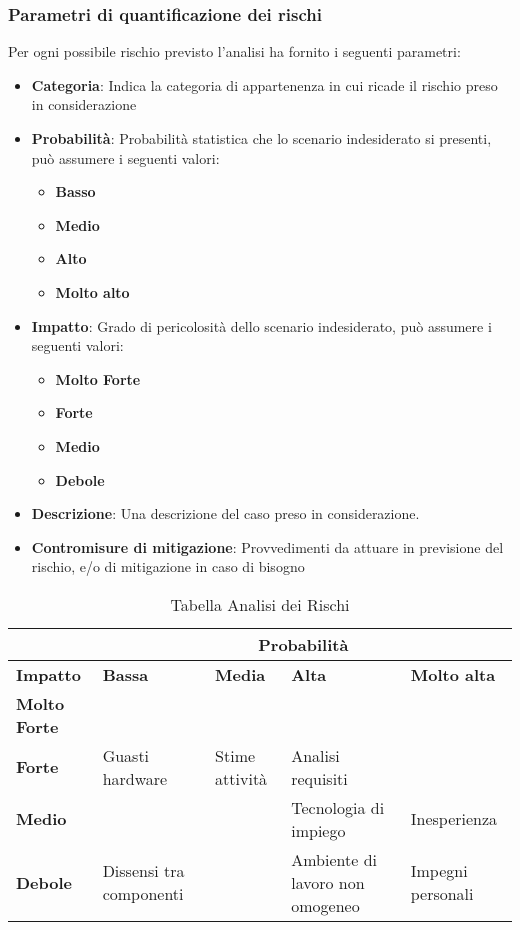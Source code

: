 \documentclass{scalatekids-article}
\begin{document}
\subsubsection{Parametri di quantificazione dei rischi}
Per ogni possibile rischio previsto l'analisi ha fornito i seguenti parametri:
\begin{itemize}
\item\textbf{Categoria}: Indica la categoria di appartenenza in cui ricade il
  rischio preso in considerazione
\item\textbf{Probabilità}: Probabilità statistica che lo scenario indesiderato
  si presenti, può assumere i seguenti valori:
  \begin{itemize}
  \item\textbf{Basso}
  \item\textbf{Medio}
  \item\textbf{Alto}
  \item\textbf{Molto alto}
  \end{itemize}
\item\textbf{Impatto}: Grado di pericolosità dello scenario indesiderato, può
  assumere i seguenti valori:
  \begin{itemize}
  \item\textbf{Molto Forte}
  \item\textbf{Forte}
  \item\textbf{Medio}
  \item\textbf{Debole}
  \end{itemize}
\item\textbf{Descrizione}: Una descrizione del caso preso in considerazione.
\item\textbf{Contromisure di mitigazione}: Provvedimenti da attuare in
  previsione del rischio, e/o di mitigazione in caso di bisogno
\end{itemize}
\begin{table}[H]
  \centering
  \scriptsize
  \caption{Tabella Analisi dei Rischi}
  \begin{tabular}{|m{1cm}|m{3cm}|m{3cm}|m{3cm}|m{3cm}|}
    \hline
    & \multicolumn{4}{|c|}{\textbf{Probabilità}}\\
    \hline
    \bf Impatto & \bf Bassa & \bf Media & \bf Alta & \textbf{Molto alta} \\
    \hline
    \bf Molto Forte & \cellcolor{red!50} & \cellcolor{red!50} & \cellcolor{red!50} &\cellcolor{red!50} \\
    \hline
    \bf Forte & \cellcolor{yellow!50}Guasti hardware & \cellcolor{yellow!50}Stime attività & \cellcolor{red!50}Analisi requisiti &\cellcolor{red!50}\\[8pt]
    \hline
    \bf Medio & \cellcolor{green!50} & \cellcolor{yellow!50} &\cellcolor{yellow!50}Tecnologia di impiego &\cellcolor{red!50}Inesperienza \\[8pt]
    \hline
    \bf Debole & \cellcolor{green!50}Dissensi tra componenti & \cellcolor{green!50} &\cellcolor{yellow!50}Ambiente di lavoro non omogeneo &\cellcolor{yellow!50}Impegni personali \\
    \hline
  \end{tabular} \\
\end{table}
\end{document}
